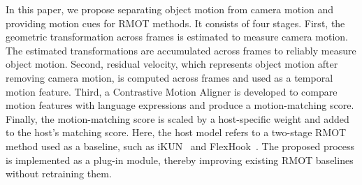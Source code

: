 \documentclass{article}
\providecommand{\DIFdelbegin}{} %
\providecommand{\DIFdelend}{} %
\providecommand{\DIFscaledelfig}{0.5}
\newlength{\DIFdelgraphicswidth} %
\newlength{\DIFdelgraphicsheight} %
\providecommand{\DIFdelincludegraphics}[2][]{%
\sbox{\DIFdelgraphicsbox}{\DIFOincludegraphics[#1]{#2}}%
\settoboxwidth{\DIFdelgraphicswidth}{\DIFdelgraphicsbox} %
\settoboxtotalheight{\DIFdelgraphicsheight}{\DIFdelgraphicsbox} %
\scalebox{\DIFscaledelfig}{%
\parbox[b]{\DIFdelgraphicswidth}{\usebox{\DIFdelgraphicsbox}\\[-\baselineskip] \rule{\DIFdelgraphicswidth}{0em}}\llap{\resizebox{\DIFdelgraphicswidth}{\DIFdelgraphicsheight}{%
\setlength{\unitlength}{\DIFdelgraphicswidth}%
\begin{picture}(1,1)%
\thicklines\linethickness{2pt} %
{\color[rgb]{1,0,0}\put(0,0){\framebox(1,1){}}}%
{\color[rgb]{1,0,0}\put(0,0){\line( 1,1){1}}}%
{\color[rgb]{1,0,0}\put(0,1){\line(1,-1){1}}}%
\end{picture}%
}\hspace*{3pt}}} %
} %
\DeclareRobustCommand{\DIFdelbegin}{\DIFOdelbegin \let\includegraphics\DIFdelincludegraphics} %
\DeclareRobustCommand{\DIFdelend}{\DIFOaddend \let\includegraphics\DIFOincludegraphics} %
\begin{document}
\DIFdelbegin %

\DIFdelend In this paper, we propose separating object motion from camera motion and providing motion cues for RMOT methods. It consists of four stages. First, the geometric transformation across frames is estimated to measure camera motion. The estimated transformations are accumulated across frames to reliably measure object motion. Second, residual velocity, which represents object motion after removing camera motion, is computed across frames and used as a temporal motion feature. Third, a Contrastive Motion Aligner is developed to compare motion features with language expressions and produce a motion-matching score. Finally, the motion-matching score is scaled by a host-specific weight and added to the host's matching score. Here, the host model refers to a two-stage RMOT method used as a baseline, such as iKUN~\cite{ikun} and FlexHook~\cite{flexhook}. The proposed process is implemented as a plug-in module, thereby improving existing RMOT baselines without retraining them.

\DIFdelbegin %

\end{document}
